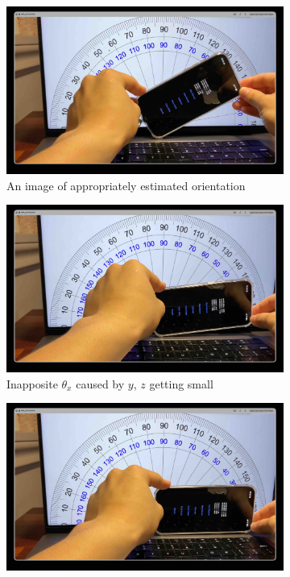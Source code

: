 \documentclass{article}
\begin{document}
\FloatBarrier
\begin{figure}[h]
    \begin{subfigure}{0.5\textwidth}
        \includegraphics[width=\textwidth]{Images/2_1_3_1.jpg}
        \caption{An image of appropriately estimated orientation}
        \label{fig:2_1_3_1}
    \end{subfigure}
    \begin{subfigure}{0.5\textwidth}
        \includegraphics[width=\textwidth]{Images/2_1_3_2.jpg}
        \caption{Inapposite $\theta_x$ caused by $y$, $z$ getting small}
        \label{fig:2_1_3_2}
    \end{subfigure}
    \begin{subfigure}{0.5\textwidth}
        \includegraphics[width=\textwidth]{Images/2_1_3_3.jpg}

\end{subfigure}
\end{figure}
\end{document}
